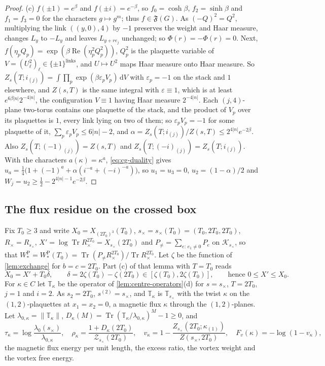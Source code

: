 \documentclass[11pt,a4paper]{amsart}
\theoremstyle{definition}
\theoremstyle{remark}
\numberwithin{equation}{section}
\DeclareMathOperator{\Tr}{Tr}        %
\newcommand{\Kspace}{\mathcal{K}}    %
\newcommand{\Fclass}{\mathfrak{F}}   %
\newcommand{\norm}[1]{\lVert #1\rVert}     %
\newcommand{\dd}{\,\mathrm{d}}             %
\newcommand{\TT}{\mathbb{T}}               %
\newcommand{\Zpart}[2]{Z(#1,#2)}           %
\newcommand{\Zc}{\mathcal{Z}}              %
\newcommand{\Zs}[2]{\Zc_{#1}(#2)}          %
\newcommand{\XT}[2]{X_{#1}(#2)}            %
\newcommand{\cube}[1]{(2#1)^3}             %
\newcommand{\lzero}{\lambda_0}             %
\begin{document}
\begin{proof}
(c) $f(\pm1)=e^\beta$ and $f(\pm i)=e^{-\beta}$, so $f_0=\cosh\beta$, $f_2=\sinh\beta$ and $f_1=f_3=0$ for the characters $g\mapsto g^m$; thus $f\in\Fclass(G)$. As $(-Q)^2=Q^2$, multiplying the link $((y,0),4)$ by $-1$ preserves the weight and Haar measure, changes $L_y$ to $-L_y$ and leaves $L_{y+re_j}$ unchanged; so $\Phi(r)=-\Phi(r)=0$. Next, $f(\eta_pQ_p)=\exp(\beta\operatorname{Re}(\eta_p^2Q_p^2))$, $Q_p^2$ is the plaquette variable of $V=(U_\ell^2)_\ell\in\{\pm1\}^{\text{links}}$, and $U\mapsto U^2$ maps Haar measure onto Haar measure. So $Z_s(T;i_{(j)})=\int\prod_p\exp(\beta\varepsilon_pV_p)\dd V$ with $\varepsilon_p=-1$ on the stack and $1$ elsewhere, and $\Zpart{s}{T}$ is the same integral with $\varepsilon\equiv1$, which is at least $e^{6\beta|n|}2^{-4|n|}$, the configuration $V\equiv1$ having Haar measure $2^{-4|n|}$. Each $(j,4)$-plane two-torus contains one plaquette of the stack, and the product of $V_p$ over its plaquettes is $1$, every link lying on two of them; so $\varepsilon_pV_p=-1$ for some plaquette of it, $\sum_p\varepsilon_pV_p\le6|n|-2$, and $\alpha=Z_s(T;i_{(j)})/\Zpart{s}{T}\le2^{4|n|}e^{-2\beta}$. Also $Z_s(T;(-1)_{(j)})=\Zpart{s}{T}$ and $Z_s(T;(-i)_{(j)})=Z_s(T;i_{(j)})$. With the characters $a(\kappa)=\kappa^a$, \eqref{eq:cg-duality} gives $u_a=\frac14\bigl(1+(-1)^a+\alpha(i^{-a}+(-i)^{-a})\bigr)$, so $u_1=u_3=0$, $u_2=(1-\alpha)/2$ and $W_j=u_2\ge\frac12-2^{4|n|-1}e^{-2\beta}$.
\end{proof}

\subsection{The flux residue on the crossed box}

Fix $T_0\ge3$ and write $X_0=\XT{\cube{T_0}}{T_0}$, $s_\times=s_\times(T_0)=(T_0,2T_0,2T_0)$, $R_\times=R_{s_\times}$, $X'=\log\Tr R_\times^{2T_0}=\XT{s_\times}{2T_0}$ and $P_{\ne}=\sum_{e:\,e_1\ne0}P_e$ on $\Kspace_{s_\times}$, so that $W^{\mathrm P}_*=W^{\mathrm P}_*(T_0)=\Tr(P_{\ne}R_\times^{2T_0})/\Tr R_\times^{2T_0}$. Let $\zeta$ be the function of \cref{lem:exchange} for $b=c=2T_0$. Part (c) of that lemma with $T=T_0$ reads
\begin{equation}\label{eq:cg-crossed}
X_0=X'+T_0\delta,\qquad \delta=2\zeta(T_0)-\zeta(2T_0)\in[\zeta(T_0),2\zeta(T_0)],\qquad\text{hence }0\le X'\le X_0 .
\end{equation}
For $\kappa\in C$ let $\TT_\kappa$ be the operator of \cref{lem:centre-operators}\textup{(d)} for $s=s_\times$, $T=2T_0$, $j=1$ and $i=2$. As $s_2=2T_0$, $s^{(2)}=s_\times$, and $\TT_\kappa$ is $\TT_{s_\times}$ with the twist $\kappa$ on the $(1,2)$-plaquettes at $x_1=x_2=0$, a magnetic flux $\kappa$ through the $(1,2)$-planes. Let $\lambda_{0,\kappa}=\norm{\TT_\kappa}$, $D_\kappa(M)=\Tr(\TT_\kappa/\lambda_{0,\kappa})^M-1\ge0$, and
\[
\tau_\kappa=\log\frac{\lzero(s_\times)}{\lambda_{0,\kappa}},\quad \rho_\kappa=\frac{1+D_\kappa(2T_0)}{\Zs{s_\times}{2T_0}},\quad v_\kappa=1-\frac{Z_{s_\times}(2T_0;\kappa_{(1)})}{\Zpart{s_\times}{2T_0}},\quad F_v(\kappa)=-\log(1-v_\kappa),
\]
the magnetic flux energy per unit length, the excess ratio, the vortex weight and the vortex free energy.
\end{document}
